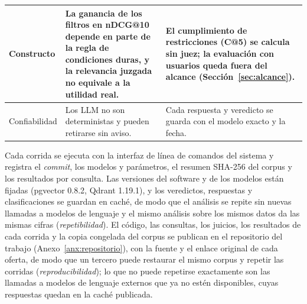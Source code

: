 \begin{table}[!htb]
\begin{tabular}{|p{2cm}|p{6.3cm}|p{5.9cm}|}
        \hline
        Constructo & La ganancia de los filtros en nDCG@10 depende en parte de la regla de condiciones duras, y la relevancia juzgada no equivale a la utilidad real. & El cumplimiento de restricciones (C@5) se calcula sin juez; la evaluación con usuarios queda fuera del alcance (Sección~\ref{sec:alcance}). \\
        \hline
        Confiabilidad & Los LLM no son deterministas y pueden retirarse sin aviso. & Cada respuesta y veredicto se guarda con el modelo exacto y la fecha. \\
        \hline
    \end{tabular}
\end{table}

Cada corrida se ejecuta con la interfaz de línea de comandos del sistema y registra el \textit{commit}, los modelos y parámetros, el resumen SHA-256 del corpus y los resultados por consulta. Las versiones del software y de los modelos están fijadas (pgvector 0.8.2, Qdrant 1.19.1), y los veredictos, respuestas y clasificaciones se guardan en caché, de modo que el análisis se repite sin nuevas llamadas a modelos de lenguaje y el mismo análisis sobre los mismos datos da las mismas cifras (\emph{repetibilidad}). El código, las consultas, los juicios, los resultados de cada corrida y la copia congelada del corpus se publican en el repositorio del trabajo (Anexo~\ref{anx:repositorio}), con la fuente y el enlace original de cada oferta, de modo que un tercero puede restaurar el mismo corpus y repetir las corridas (\emph{reproducibilidad}); lo que no puede repetirse exactamente son las llamadas a modelos de lenguaje externos que ya no estén disponibles, cuyas respuestas quedan en la caché publicada.
